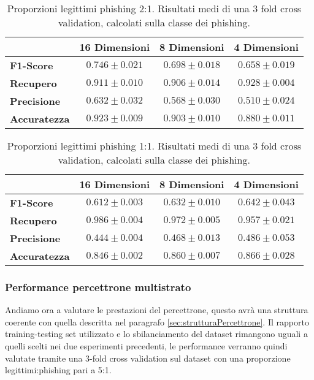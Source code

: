 \documentclass[../../main.tex]{subfiles}
\begin{document}
    \begin{table}[H]
        \centering
        \begin{tabular}{lccc}
            \toprule
            {} &                      \textbf{16 Dimensioni} & \textbf{8 Dimensioni} & \textbf{4 Dimensioni} \\
            \midrule
            \textbf{F1-Score }      &      $0.746 \pm 0.021$ & $0.698 \pm 0.018$ & $0.658 \pm 0.019$\\
            \textbf{Recupero   }    &      $0.911 \pm 0.010$ & $0.906 \pm 0.014$ & $0.928 \pm 0.004$\\
            \textbf{Precisione}     &      $0.632 \pm 0.032$ & $0.568 \pm 0.030$ & $0.510 \pm 0.024$\\
            \textbf{Accuratezza }   &      $0.923 \pm 0.009$ & $0.903 \pm 0.010$ & $0.880 \pm 0.011$\\
            \bottomrule
        \end{tabular}     
        \caption{Proporzioni legittimi phishing 2:1. Risultati medi di una 3 fold cross validation, calcolati sulla classe dei phishing.} 
        \label{tab:2a1Undersampling}  
    \end{table}

    \begin{table}[H]
        \centering
        \begin{tabular}{lccc}
            \toprule
            {} &                      \textbf{16 Dimensioni} & \textbf{8 Dimensioni} & \textbf{4 Dimensioni} \\
            \midrule
            \textbf{F1-Score }      &      $0.612 \pm 0.003$ & $0.632 \pm 0.010$ & $0.642 \pm 0.043$\\
            \textbf{Recupero   }    &      $0.986 \pm 0.004$ & $0.972 \pm 0.005$ & $0.957 \pm 0.021$\\
            \textbf{Precisione}     &      $0.444 \pm 0.004$ & $0.468 \pm 0.013$ & $0.486 \pm 0.053$\\
            \textbf{Accuratezza }   &      $0.846 \pm 0.002$ & $0.860 \pm 0.007$ & $0.866 \pm 0.028$\\
            \bottomrule
        \end{tabular}     
        \caption{Proporzioni legittimi phishing 1:1. Risultati medi di una 3 fold cross validation, calcolati sulla classe dei phishing.}  
        \label{tab:1a1Undersampling} 
    \end{table}

    \subsubsection{Performance percettrone multistrato}
    Andiamo ora a valutare le prestazioni del percettrone, questo avrà una struttura coerente con quella descritta nel paragrafo \ref{sec:strutturaPercettrone}. Il rapporto training-testing set utilizzato e lo sbilanciamento del dataset rimangono uguali a quelli scelti nei due esperimenti precedenti, le performance verranno quindi valutate tramite una 3-fold cross validation sul dataset con una proporzione legittimi:phishing pari a 5:1.
\end{document}
